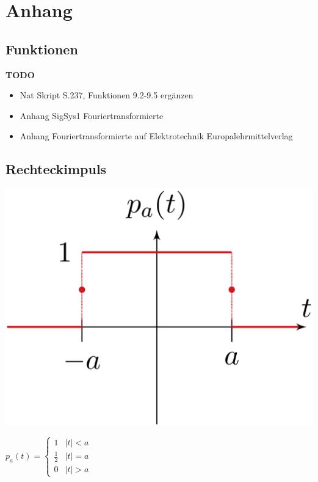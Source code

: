 \section{Anhang}
	\subsection{Funktionen}
	
	\textbf{TODO}
		\begin{itemize}
				\item Nat Skript S.237, Funktionen 9.2-9.5 ergänzen
				\item Anhang SigSys1 Fouriertransformierte
				\item Anhang Fouriertransformierte auf Elektrotechnik Europalehrmittelverlag
		\end{itemize}
	
	
		\subsection{Rechteckimpuls}
		\begin{minipage}{0.2\textwidth}
			\includegraphics[width=\textwidth]{./bilder/funktionen/rechteckF.png}
		\end{minipage}
		\qquad
		\begin{minipage}{0.45\textwidth}
			$p_{a}(t)=\begin{cases}
			1 & |t|<a \\ 
			\frac{1}{2} & |t|=a \\ 
			0 & |t|>a
			\end{cases}$
		\end{minipage}
		\qquad
		\begin{minipage}{0.25\textwidth}						
		\end{minipage}
		
